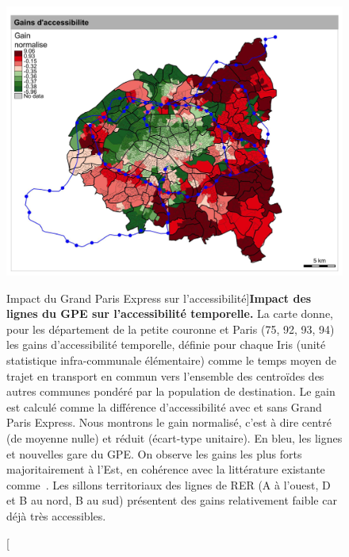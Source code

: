 \begin{figure}[h!]
	\includegraphics[width=\linewidth]{Figures/Final/1-2-1-fig-casestudies-gpe.jpg}
	\caption[Impact of \emph{Grand Paris Express} on accessibility][Impact du Grand Paris Express sur l'accessibilité]{\label{fig:casestudies:gpe}}{\textbf{Impact des lignes du GPE sur l'accessibilité temporelle.} La carte donne, pour les département de la petite couronne et Paris (75, 92, 93, 94) les gains d'accessibilité temporelle, définie pour chaque Iris (unité statistique infra-communale élémentaire) comme le temps moyen de trajet en transport en commun vers l'ensemble des centroïdes des autres communes pondéré par la population de destination. Le gain est calculé comme la différence d'accessibilité avec et sans Grand Paris Express. Nous montrons le gain normalisé, c'est à dire centré (de moyenne nulle) et réduit (écart-type unitaire). En bleu, les lignes et nouvelles gare du GPE. On observe les gains les plus forts majoritairement à l'Est, en cohérence avec la littérature existante comme~\cite{beaucire2013grand}. Les sillons territoriaux des lignes de RER (A à l'ouest, D et B au nord, B au sud) présentent des gains relativement faible car déjà très accessibles.\label{fig:casestudies:gpe}}
\end{figure}


